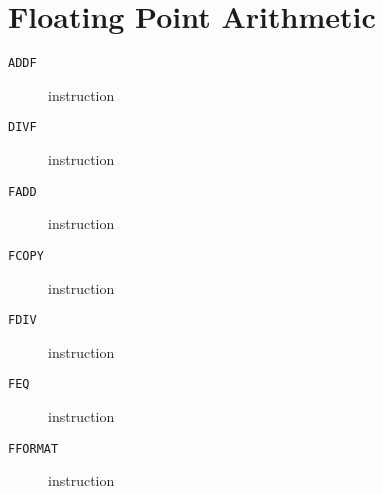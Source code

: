 \section{Floating Point Arithmetic}
\begin{description}
\item[\texttt{ADDF}] instruction\\

\end{description}
\clearpage
\begin{description}
\item[\texttt{DIVF}] instruction\\

\end{description}
\clearpage
\begin{description}
\item[\texttt{FADD}] instruction\\

\end{description}
\clearpage
\begin{description}
\item[\texttt{FCOPY}] instruction\\

\end{description}
\clearpage
\begin{description}
\item[\texttt{FDIV}] instruction\\

\end{description}
\clearpage
\begin{description}
\item[\texttt{FEQ}] instruction\\

\end{description}
\clearpage
\begin{description}
\item[\texttt{FFORMAT}] instruction\\

\end{description}
\clearpage
